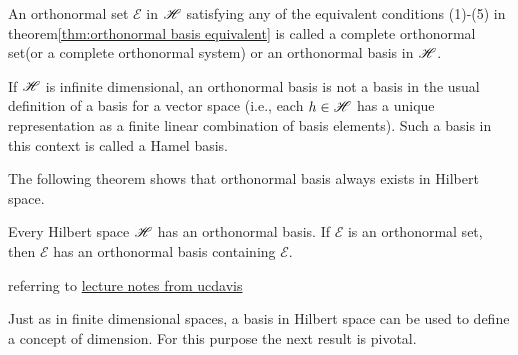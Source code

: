 




\begin{definition}{}{}
    An orthonormal set $\mathscr{E}$ in $\mathscr{H}$ satisfying any of the equivalent conditions (1)-(5) in theorem\ref{thm:orthonormal basis equivalent} 
    is called a complete orthonormal set(or a complete orthonormal system) or an orthonormal basis in $\mathscr{H}$. 
\end{definition}

\begin{remark}
    If $\mathscr{H}$ is infinite dimensional, an orthonormal basis is not a basis in the usual
    definition of a basis for a vector space (i.e., each $h\in\mathscr{H}$ has a unique representation as a
    finite linear combination of basis elements). Such a basis in this context is called a Hamel
    basis.
\end{remark}

The following theorem shows that orthonormal basis always exists in Hilbert space.
\begin{theorem}{}{}
    Every Hilbert space $\mathscr{H}$ has an orthonormal basis. If $\mathscr{E}$ is an orthonormal set, then $\mathscr{E}$ has an orthonormal basis containing $\mathscr{E}$. 
\end{theorem}

\begin{proofsolution}
    referring to \href{https://www.math.ucdavis.edu/~hunter/book/ch6.pdf}{lecture notes from ucdavis}
\end{proofsolution}

Just as in finite dimensional spaces, a basis in Hilbert space can be used 
to define a concept of dimension. For this purpose the next result is pivotal.

